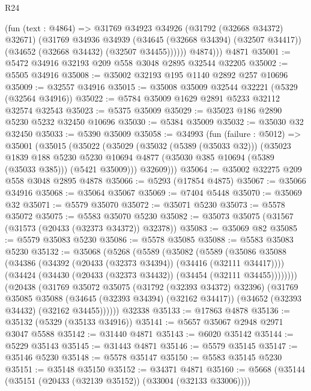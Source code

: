 \begin{lexlean}{R24}
\begin{coremodule}
            (fun (text : @4864) =>
            @31769
              @34923
              @34926
              (@31792 (@32668 @34372) @32671)
              (@31769
                @34936
                @34939
                (@34645 (@32668 @34394) (@32507 @34417))
                (@34652 (@32668 @34432) (@32507 @34455))))))
          @4874)))
    @4871
@35001 := @5472 @34916 @32193 @209 @558 @3048 @2895 @32544 @32205
@35002 := @5505 @34916
@35008 := @35002 @32193 @195 @1140 @2892 @257 @10696
@35009 := @32557 @34916
@35015 := @35008 @35009 @32544 @32221 (@5329 (@32564 @34916))
@35022 := @5784 @35009 @1629 @2891 @5233 @32112 @32574 @32543
@35023 := @5375 @35009
@35029 := @35023 @186 @2890 @5230 @5232 @32450 @10696
@35030 := @5384 @35009
@35032 := @35030 @32 @32450
@35033 := @5390 @35009
@35058 := @34993
    (fun (failure : @5012) =>
    @35001
      (@35015
        (@35022
          (@35029
            (@35032 (@5389 (@35033 @32)))
            (@35023
              @1839
              @188
              @5230
              @5230
              @10694
              @4877
              (@35030 @385 @10694 (@5389 (@35033 @385)))
              (@5421 @35009)))
          @32609)))
@35064 := @35002 @32275 @209 @558 @3048 @2895 @4878
@35066 := @5293 (@17854 @4875)
@35067 := @35066 @34916
@35068 := @35064 @35067
@35069 := @7404 @5448
@35070 := @35069 @32
@35071 := @5579 @35070
@35072 := @35071 @5230
@35073 := @5578 @35072
@35075 := @5583 @35070 @5230
@35082 := @35073 @35075 (@31567 (@31573 (@20433 (@32373 @34372)) @32378))
@35083 := @35069 @82
@35085 := @5579 @35083 @5230
@35086 := @5578 @35085
@35088 := @5583 @35083 @5230
@35132 := @35068
    (@5268
      (@5589
        (@35082
          (@5589
            (@35086
              @35088
              (@34386 (@34392 (@20433 (@32373 @34394)) (@34416 (@32111 @34417))))
              (@34424 (@34430 (@20433 (@32373 @34432)) (@34454 (@32111 @34455))))))))
      (@20438
        (@31769
          @35072
          @35075
          (@31792 (@32393 @34372) @32396)
          (@31769
            @35085
            @35088
            (@34645 (@32393 @34394) (@32162 @34417))
            (@34652 (@32393 @34432) (@32162 @34455))))))
    @32338
@35133 := @17863 @4878
@35136 := @35132 (@5329 (@35133 @34916))
@35141 := @5657 @35067 @2948 @2971 @3047 @5588
@35142 := @31440 @4871
@35143 := @6020 @35142
@35144 := @5229 @35143
@35145 := @31443 @4871
@35146 := @5579 @35145
@35147 := @35146 @5230
@35148 := @5578 @35147
@35150 := @5583 @35145 @5230
@35151 := @35148 @35150
@35152 := @34371 @4871
@35160 := @5668 (@35144 (@35151 (@20433 (@32139 @35152)) (@33004 (@32133 @33006))))

\end{coremodule}
\end{lexlean}
